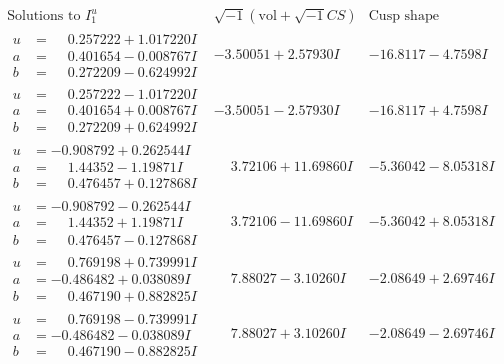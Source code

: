 \documentclass[1p]{elsarticle_modified}
\theoremstyle{definition}
\newcommand{\I}{\sqrt{-1}}
\begin{document}
$$\begin{array}{c|c|c}  
\text{Solutions to }I^u_{1}& \I (\text{vol} + \sqrt{-1}CS) & \text{Cusp shape}\\
 \hline 
\begin{aligned}
u &= \phantom{-}0.257222 + 1.017220 I \\
a &= \phantom{-}0.401654 - 0.008767 I \\
b &= \phantom{-}0.272209 - 0.624992 I\end{aligned}
 & -3.50051 + 2.57930 I & -16.8117 - 4.7598 I \\ \hline\begin{aligned}
u &= \phantom{-}0.257222 - 1.017220 I \\
a &= \phantom{-}0.401654 + 0.008767 I \\
b &= \phantom{-}0.272209 + 0.624992 I\end{aligned}
 & -3.50051 - 2.57930 I & -16.8117 + 4.7598 I \\ \hline\begin{aligned}
u &= -0.908792 + 0.262544 I \\
a &= \phantom{-}1.44352 - 1.19871 I \\
b &= \phantom{-}0.476457 + 0.127868 I\end{aligned}
 & \phantom{-}3.72106 + 11.69860 I & -5.36042 - 8.05318 I \\ \hline\begin{aligned}
u &= -0.908792 - 0.262544 I \\
a &= \phantom{-}1.44352 + 1.19871 I \\
b &= \phantom{-}0.476457 - 0.127868 I\end{aligned}
 & \phantom{-}3.72106 - 11.69860 I & -5.36042 + 8.05318 I \\ \hline\begin{aligned}
u &= \phantom{-}0.769198 + 0.739991 I \\
a &= -0.486482 + 0.038089 I \\
b &= \phantom{-}0.467190 + 0.882825 I\end{aligned}
 & \phantom{-}7.88027 - 3.10260 I & -2.08649 + 2.69746 I \\ \hline\begin{aligned}
u &= \phantom{-}0.769198 - 0.739991 I \\
a &= -0.486482 - 0.038089 I \\
b &= \phantom{-}0.467190 - 0.882825 I\end{aligned}
 & \phantom{-}7.88027 + 3.10260 I & -2.08649 - 2.69746 I \\ \hline\begin{aligned}

\end{aligned}
\end{array}$$
\end{document}
